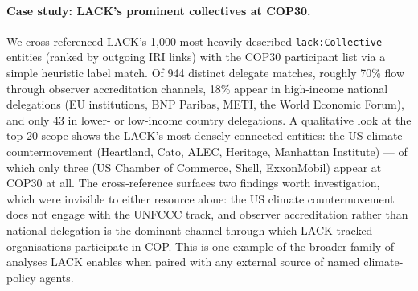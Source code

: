 \begin{sloppypar}
\paragraph{Case study: LACK's prominent collectives at COP30.}
We cross-referenced LACK's 1{,}000 most heavily-described \texttt{lack:Collective} entities (ranked by outgoing IRI links) with the COP30 participant list via a simple heuristic label match.
Of 944 distinct delegate matches, roughly 70\% flow through observer accreditation channels, 18\% appear in high-income national delegations (EU institutions, BNP Paribas, METI, the World Economic Forum), and only 43 in lower- or low-income country delegations.
A qualitative look at the top-20 scope shows the LACK's most densely connected entities: the US climate countermovement (Heartland, Cato, ALEC, Heritage, Manhattan Institute) --- of which only three (US Chamber of Commerce, Shell, ExxonMobil) appear at COP30 at all.
The cross-reference surfaces two findings worth investigation, which were invisible to either resource alone: the US climate countermovement does not engage with the UNFCCC track, and observer accreditation rather than national delegation is the dominant channel through which LACK-tracked organisations participate in COP.
This is one example of the broader family of analyses LACK enables when paired with any external source of named climate-policy agents. 
\end{sloppypar}
